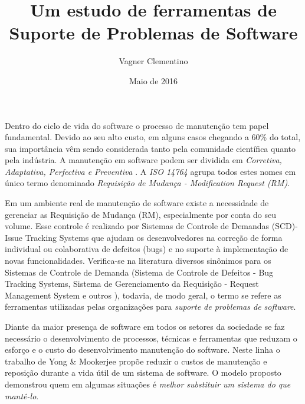 \documentclass[12pt]{article}
\title{Um estudo de ferramentas de \\
	Suporte de Problemas de Software}
\author{Vagner Clementino\inst{1}}
\date{Maio de 2016}
\begin{document}
\maketitle


Dentro do ciclo de vida do software o processo de manutenção tem papel fundamental. Devido ao seu alto custo, em alguns casos chegando a 60\% do total\cite{kaur2015review}, sua importância vêm sendo considerada tanto pela comunidade científica quanto pela indústria. A manutenção em software podem ser dividida em \textit{Corretiva, Adaptativa, Perfectiva e Preventiva} \cite{Lientz:1980:SMM:601062,159342}. A \textit{ISO 14764} \cite{1703974} agrupa todos estes nomes em único termo denominado \textit{Requisição de Mudança - Modification Request (RM)}.

Em um ambiente real de manutenção de software existe a necessidade de gerenciar as Requisição de Mudança (RM), especialmente por conta do seu volume. Esse controle é realizado por Sistemas de Controle de Demandas (SCD)- Issue Tracking Systems  que ajudam os desenvolvedores na correção de forma individual ou colaborativa de defeitos (bugs) e no suporte à implementação de novas funcionalidades. Verifica-se na literatura diversos sinônimos para os Sistemas de Controle de Demanda (Sistema de Controle de Defeitos - Bug Tracking Systems, Sistema de Gerenciamento da Requisição - Request Management System e outros ), todavia, de modo geral, o termo se refere as ferramentas utilizadas pelas organizações para \textit{suporte de problemas de software}.


Diante da maior presença de software em todos os setores da sociedade se faz necessário o desenvolvimento de processos, técnicas e ferramentas que reduzam o esforço e o custo do desenvolvimento manutenção do software. Neste linha o trabalho de Yong \& Mookerjee \cite{1423995}   propõe reduzir o custos de manutenção e reposição durante a vida útil de um sistema de software. O modelo
proposto demonstrou quem em algumas situações é \textit{melhor substituir um sistema do que mantê-lo}.
\end{document}

